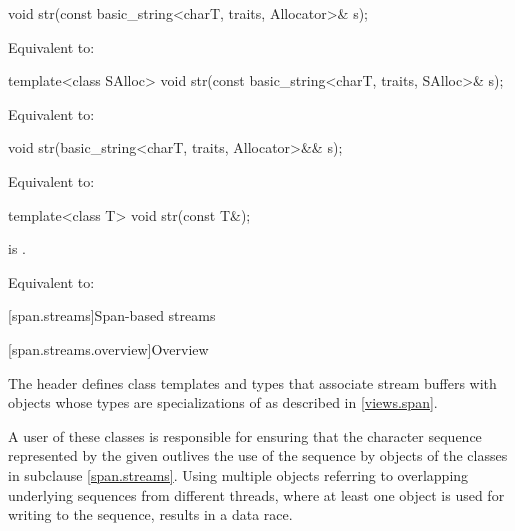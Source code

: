 %
\begin{itemdecl}
void str(const basic_string<charT, traits, Allocator>& s);
\end{itemdecl}

\begin{itemdescr}
\pnum
\effects
Equivalent to: 
\end{itemdescr}

%
\begin{itemdecl}
template<class SAlloc>
  void str(const basic_string<charT, traits, SAlloc>& s);
\end{itemdecl}

\begin{itemdescr}
\pnum
\effects
Equivalent to: 
\end{itemdescr}

%
\begin{itemdecl}
void str(basic_string<charT, traits, Allocator>&& s);
\end{itemdecl}

\begin{itemdescr}
\pnum
\effects
Equivalent to: 
\end{itemdescr}

%
\begin{itemdecl}
template<class T>
  void str(const T&);
\end{itemdecl}

\begin{itemdescr}
\pnum
\constraints
{}
is .

\pnum
\effects
Equivalent to: 
\end{itemdescr}

[span.streams]{Span-based streams}

[span.streams.overview]{Overview}

\pnum
The header  defines class templates and types
that associate stream buffers with objects whose types are
specializations of  as described in \ref{views.span}.
\begin{note}
A user of these classes is responsible for ensuring
that the character sequence represented by the given 
outlives the use of the sequence by objects of the classes in subclause \ref{span.streams}.
Using multiple  objects
referring to overlapping underlying sequences from different threads,
where at least one  object is used
for writing to the sequence,
results in a data race.
\end{note}

